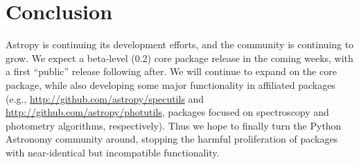 \documentclass[11pt,twoside]{article}
\begin{document}
\section{Conclusion}
Astropy is continuing its development efforts, and the community is continuing to grow.  We expect a beta-level (0.2) core package release in the coming weeks, with a first ``public'' release following after.  We will continue to expand on the core package, while also developing some major functionality in affiliated packages (e.g., \url{http://github.com/astropy/specutils} and \url{http://github.com/astropy/photutils}, packages focused on spectroscopy and photometry algorithms, respectively). Thus we hope to finally turn the Python Astronomy community around, stopping the harmful proliferation of packages with near-identical but incompatible functionality.
\end{document}
